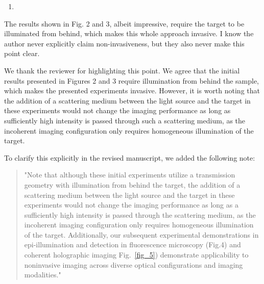 \documentclass[12pt]{article}
\newenvironment{solved_reviewercomment}
    {\begin{tcolorbox}[width=\linewidth,colback=gray!5,colframe=solved_commentcolor!50,title=Reviewer Comment,left=5pt,right=5pt]}
    {\end{tcolorbox}}
\newenvironment{ourresponse}
    {\begin{tcolorbox}[width=\linewidth,breakable,enhanced,colback=gray!5,colframe=responsecolor!50,title=Response,left=5pt,right=5pt]}
    {\end{tcolorbox}}
\begin{document}
        
\begin{enumerate}[label=\arabic*., resume]
\item \leavevmode
\end{enumerate}
\vspace{-1em}
\begin{solved_reviewercomment}
    The results shown in Fig. 2 and 3, albeit impressive, require the target to be illuminated from behind, which makes this whole approach invasive. I know the author never explicitly claim non-invasiveness, but they also never make this point clear.
\end{solved_reviewercomment}

\begin{ourresponse}
    We thank the reviewer for highlighting this point.
    We agree that the initial results presented in Figures 2 and 3 require illumination from behind the sample, which makes the presented experiments invasive. However, it is worth noting that the addition of a scattering medium between the light source and the target in these experiments would not change the imaging performance as long as sufficiently high intensity is passed through such a scattering medium, as the incoherent imaging configuration only requires homogeneous illumination of the target.
    
    To clarify this explicitly in the revised manuscript, we added the following note:
    \begin{quote}
        "Note that although these initial experiments utilize a transmission geometry with illumination from behind the target, the addition of a scattering medium between the light source and the target in these experiments would not change the imaging performance as long as a sufficiently high intensity is passed through the scattering medium, as the incoherent imaging configuration only requires homogeneous illumination of the target. Additionally, our subsequent experimental demonstrations in epi-illumination and detection in fluorescence microscopy (Fig.4) and coherent holographic imaging Fig.~\ref{fig_5}) demonstrate applicability to noninvasive imaging across diverse optical configurations and imaging modalities."
    \end{quote}

\end{ourresponse}
\end{document}
